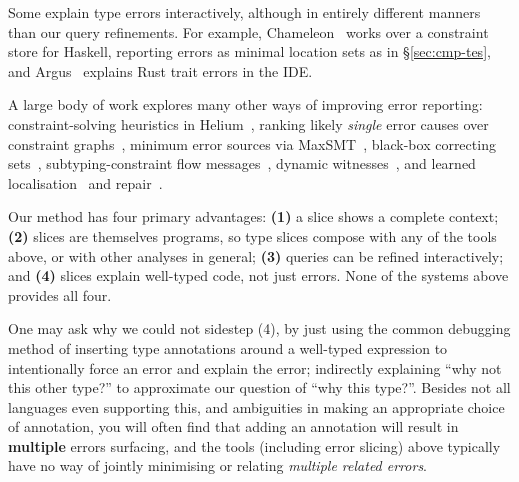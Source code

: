 Some explain type errors interactively, although in entirely different manners than our query refinements. For example, Chameleon~\cite{StuckeyChameleon2003} works over a constraint store for Haskell, reporting errors as minimal location sets as in \S\ref{sec:cmp-tes}, and Argus~\cite{Argus2025} explains Rust trait errors in the IDE.

A large body of work explores many other ways of improving error reporting: constraint-solving heuristics in Helium~\cite{HeerenHageSwierstra2003}, ranking likely \textit{single} error causes over constraint graphs~\cite{ZhangMyers2014,SHErrLoc2015}, minimum error sources via MaxSMT~\cite{PavlinovicKingWies2014,PavlinovicICFP2015}, black-box correcting sets~\cite{Mycroft2016}, subtyping-constraint flow messages~\cite{FlowMessages2023}, dynamic witnesses~\cite{SeidelJhalaWeimer2016}, and learned localisation~\cite{NATE2017} and repair~\cite{Rite2020}. 

Our method has four primary advantages: \textbf{(1)} a slice shows a complete context; \textbf{(2)} slices are themselves programs, so type slices compose with any of the tools above, or with other analyses in general; \textbf{(3)} queries can be refined interactively; and \textbf{(4)} slices explain well-typed code, not just errors. None of the systems above provides all four. 

One may ask why we could not sidestep (4), by just using the common debugging method of inserting type annotations around a well-typed expression to intentionally force an error and explain the error; indirectly explaining ``why not this other type?'' to approximate our question of ``why this type?''. Besides not all languages even supporting this, and ambiguities in making an appropriate choice of annotation, you will often find that adding an annotation will result in \textbf{multiple} errors surfacing, and the tools (including error slicing) above typically have no way of jointly minimising or relating \textit{multiple related errors}.

